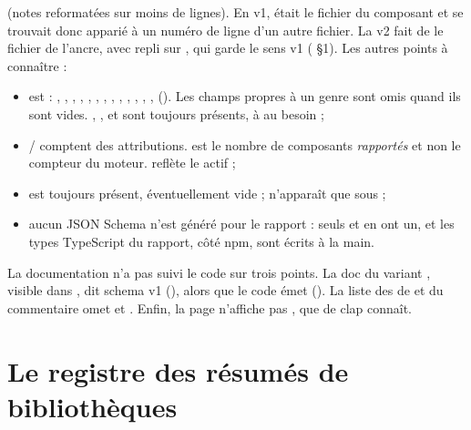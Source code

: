 \noindent(notes reformatées sur moins de lignes). En v1,  était le fichier du composant et se trouvait donc apparié à un numéro de ligne d'un autre fichier. La v2 fait de  le fichier de l'ancre, avec repli sur , qui garde le sens v1 ( §1). Les autres points à connaître :
\begin{itemize}
  \item {} est  : , , , , , , , , , , , , ,  (). Les champs propres à un genre sont omis quand ils sont vides. , ,  et  sont toujours présents, à  au besoin ;
  \item {}/ comptent des attributions.  est le nombre de composants \emph{rapportés} et non le compteur du moteur.  reflète le  actif ;
  \item {} est toujours présent, éventuellement vide ;  n'apparaît que sous  ;
  \item aucun JSON Schema n'est généré pour le rapport : seuls  et  en ont un, et les types TypeScript du rapport, côté npm, sont écrits à la main.
\end{itemize}

\begin{remarque}
La documentation n'a pas suivi le code sur trois points. La doc du variant , visible dans , dit \og schema v1\fg{} (), alors que le code émet  (). La liste des  de  et du commentaire  omet  et . Enfin, la page  n'affiche pas , que  de clap connaît.
\end{remarque}

\section{Le registre des résumés de bibliothèques}
\label{sec:projet-cli-driver-summary}

